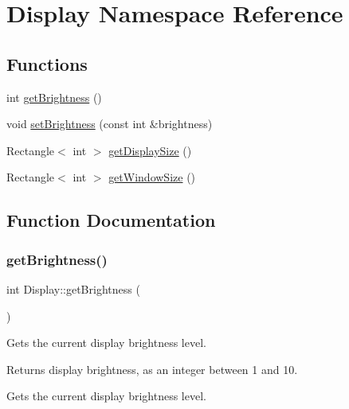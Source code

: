 \hypertarget{namespaceDisplay}{}\section{Display Namespace Reference}
\label{namespaceDisplay}
\subsection*{Functions}
\begin{DoxyCompactItemize}
\item 
int \mbox{\hyperlink{namespaceDisplay_a0bdcda0e79ba7d0fcf25c6e31256ce02}{get\+Brightness}} ()
\item 
void \mbox{\hyperlink{namespaceDisplay_a6965f1373908aadf49a66f4537835ed5}{set\+Brightness}} (const int \&brightness)
\item 
Rectangle$<$ int $>$ \mbox{\hyperlink{namespaceDisplay_a712b05610783ba22b437222e777e7ce5}{get\+Display\+Size}} ()
\item 
Rectangle$<$ int $>$ \mbox{\hyperlink{namespaceDisplay_afd822a7c63a9a91adba3c8db2b14e34a}{get\+Window\+Size}} ()
\end{DoxyCompactItemize}


\subsection{Function Documentation}
\mbox{\label{namespaceDisplay_a0bdcda0e79ba7d0fcf25c6e31256ce02}} 
\subsubsection{\texorpdfstring{get\+Brightness()}{getBrightness()}}
{\footnotesize\ttfamily int Display\+::get\+Brightness (\begin{DoxyParamCaption}{ }\end{DoxyParamCaption})}

Gets the current display brightness level.

\begin{DoxyReturn}{Returns}
display brightness, as an integer between 1 and 10.
\end{DoxyReturn}
Gets the current display brightness level. \mbox{\label{namespaceDisplay_a712b05610783ba22b437222e777e7ce5}} 
